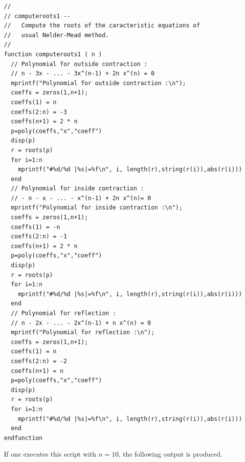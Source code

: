 \lstset{language=Scilab}
\lstset{numbers=left}
\lstset{basicstyle=\footnotesize}
\lstset{keywordstyle=\bfseries}
\begin{lstlisting}
//
// computeroots1 --
//   Compute the roots of the caracteristic equations of 
//   usual Nelder-Mead method.
//
function computeroots1 ( n )
  // Polynomial for outside contraction :
  // n - 3x - ... - 3x^(n-1) + 2n x^(n) = 0
  mprintf("Polynomial for outside contraction :\n");
  coeffs = zeros(1,n+1);
  coeffs(1) = n
  coeffs(2:n) = -3
  coeffs(n+1) = 2 * n
  p=poly(coeffs,"x","coeff")
  disp(p)
  r = roots(p)
  for i=1:n
    mprintf("#%d/%d |%s|=%f\n", i, length(r),string(r(i)),abs(r(i)))
  end
  // Polynomial for inside contraction :
  // - n - x - ... - x^(n-1) + 2n x^(n)= 0
  mprintf("Polynomial for inside contraction :\n");
  coeffs = zeros(1,n+1);
  coeffs(1) = -n
  coeffs(2:n) = -1
  coeffs(n+1) = 2 * n
  p=poly(coeffs,"x","coeff")
  disp(p)
  r = roots(p)
  for i=1:n
    mprintf("#%d/%d |%s|=%f\n", i, length(r),string(r(i)),abs(r(i)))
  end
  // Polynomial for reflection :
  // n - 2x - ... - 2x^(n-1) + n x^(n) = 0
  mprintf("Polynomial for reflection :\n");
  coeffs = zeros(1,n+1);
  coeffs(1) = n
  coeffs(2:n) = -2
  coeffs(n+1) = n
  p=poly(coeffs,"x","coeff")
  disp(p)
  r = roots(p)
  for i=1:n
    mprintf("#%d/%d |%s|=%f\n", i, length(r),string(r(i)),abs(r(i)))
  end
endfunction
\end{lstlisting}

If one executes this script with $n=10$, the following 
output is produced.

